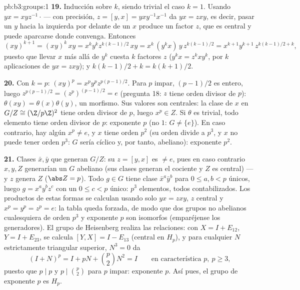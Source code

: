 \begin{solution}{pb:b3:groups:1}
\textbf{19.} Inducción sobre $k$, siendo trivial el caso $k = 1$. Usando
$yx = xyz^{-1}\cdot$\,--- con precisión, $z = [y, x] =
yxy^{-1}x^{-1}$ da $yx = zxy$, es decir, pasar un $y$ hacia la izquierda
por delante de un $x$ produce un factor $z$, que es central y puede
aparcarse donde convenga. Entonces
\[
(xy)^{k+1} = (xy)^k\,xy = x^ky^kz^{k(k-1)/2}\,xy
= x^k\,(y^kx)\,y\,z^{k(k-1)/2}
= x^{k+1}y^{k+1}\,z^{k(k-1)/2 + k},
\]
puesto que llevar $x$ más allá de $y^k$ cuesta $k$ factores $z$ ($y^kx =
z^kxy^k$, por $k$ aplicaciones de $yx = zxy$); y $k(k-1)/2 + k
= k(k+1)/2$.

\textbf{20.} Con $k = p$: $(xy)^p = x^py^pz^{p(p-1)/2}$. Para $p$ impar,
$(p-1)/2$ es entero, luego $z^{p(p-1)/2} =
(z^p)^{(p-1)/2} = e$ (pregunta 18: $z$ tiene orden divisor de $p$):
$\theta(xy) = \theta(x)\theta(y)$, un morfismo. Sus valores son
centrales: la clase de $x$ en $G/Z \cong (\Z/p\Z)^2$ tiene orden divisor
de $p$, luego $x^p \in Z$. Si $\theta$ es trivial, todo elemento tiene
orden divisor de $p$: exponente $p$ (no $1$: $G \neq
\{e\}$). En caso contrario, hay algún $x^p \neq e$, y $x$ tiene orden
$p^2$ (su orden divide a $p^3$, y $x$ no puede tener orden $p^3$: $G$
sería cíclico y, por tanto, abeliano): exponente $p^2$.

\textbf{21.} Clases $\bar x, \bar y$ que generan $G/Z$: su
 $z = [y, x]$ es $\neq e$,
pues en caso contrario $x, y, Z$ generarían un $G$ abeliano (sus clases
generan el cociente y $Z$ es central) --- y $z$ genera $Z$
($\abs Z = p$). Todo $g \in G$ tiene clase $\bar x^a\bar y^b$ para
$0 \leq a, b <
p$ únicos, luego $g = x^ay^bz^c$ con un $0 \leq c < p$ único: $p^3$
elementos, todos contabilizados. Los productos de estas formas
 se calculan usando solo
$yx = zxy$, $z$ central y $x^p = y^p =
z^p = e$: la tabla queda forzada, de modo que dos grupos no abelianos
cualesquiera de orden $p^3$ y exponente $p$ son isomorfos (emparéjense
los generadores). El grupo de Heisenberg realiza las relaciones: con
$X = I + E_{12}$, $Y = I + E_{23}$, se calcula $[Y, X] = I -
E_{13}$ (central en $H_p$), y para cualquier $N$ estrictamente
triangular superior, $N^3 = 0$ da
\[
(I + N)^p = I + pN + \binom p2N^2 = I
\qquad\text{en característica } p,\ p \geq 3,
\]
puesto que $p \mid p$ y $p \mid \binom p2$ para $p$ impar: exponente
$p$. Así pues, el grupo de exponente $p$ es $H_p$.


\end{solution}
